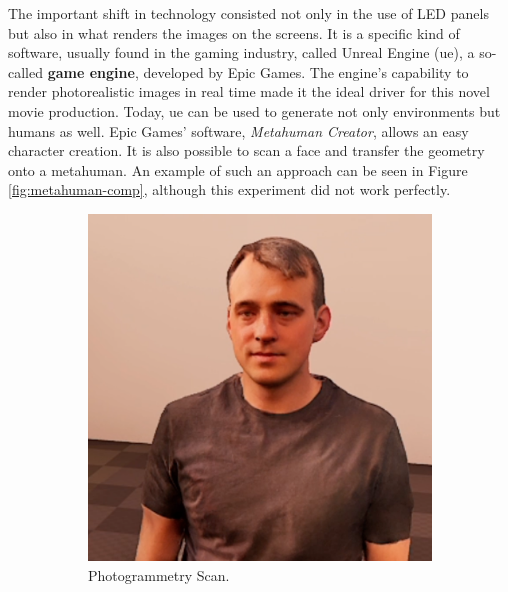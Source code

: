 \documentclass[
  a4paper,  %
  twoside,  %
  bibliography=totoc,
  headsepline,
  cleardoublepage=empty,
  parskip=half,
  draft=false
]{scrbook}
\begin{document}
The important shift in technology consisted not only in the use of LED panels but also in what renders the images on the screens. It is a specific kind of software, usually found in the gaming industry, called Unreal Engine (\gls{ue}), a so-called \textbf{game engine}, developed by Epic Games. The engine's capability to render photorealistic images in real time made it the ideal driver for this novel movie production. Today, \gls{ue} can be used to generate not only environments but humans as well. Epic Games' software, \textit{Metahuman Creator}, allows an easy character creation. It is also possible to scan a face and transfer the geometry onto a metahuman. An example of such an approach can be seen in Figure \ref{fig:metahuman-comp}, although this experiment did not work perfectly. 

\begin{figure}[h]
  \centering
  \begin{subfigure}[b]{0.45\textwidth}
    \includegraphics[width=\textwidth]{./graphics/unreal-engine/photogrammetry.png}
    \caption{Photogrammetry Scan.}
    \label{fig:head-photogrammetry-scan}
  \end{subfigure}
  \hfill
  \begin{subfigure}[b]{0.5\textwidth}

\end{subfigure}
\end{figure}
\end{document}
